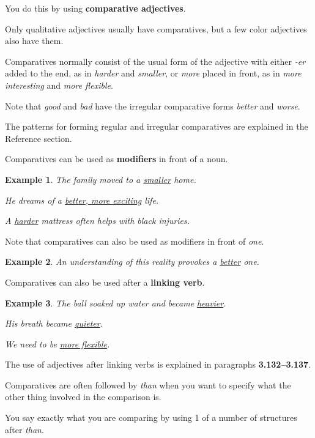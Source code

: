 \documentclass[oneside]{book}
\numberwithin{equation}{section}
\newtheorem{example}{Example}[section]
\begin{document}
You do this by using \textbf{comparative adjectives}.

Only qualitative adjectives usually have comparatives, but a few color adjectives also have them.

Comparatives normally consist of the usual form of the adjective with either \textit{-er} added to the end, as in \textit{harder} and \textit{smaller}, or \textit{more} placed in front, as in \textit{more interesting} and \textit{more flexible}.

%
Note that \textit{good} and \textit{bad} have the irregular comparative forms \textit{better} and \textit{worse}.

%
The patterns for forming regular and irregular comparatives are explained in the Reference section.

%
\noindent{} Comparatives can be used as \textbf{modifiers} in front of a noun.
\begin{example}
    The family moved to a \underline{smaller} home.
    
    He dreams of a \underline{better, more exciting} life.
    
    A \underline{harder} mattress often helps with black injuries.
\end{example}
Note that comparatives can also be used as modifiers in front of \textit{one}.
\begin{example}
    An understanding of this reality provokes a \underline{better} one.
\end{example}
%
\noindent{} Comparatives can also be used after a \textbf{linking verb}.
\begin{example}
    The ball soaked up water and became \underline{heavier}.
    
    His breath became \underline{quieter}.
    
    We need to be \underline{more flexible}.
\end{example}
The use of adjectives after linking verbs is explained in paragraphs \textbf{3.132--3.137}.

%
\noindent{} Comparatives are often followed by \textit{than} when you want to specify what the other thing involved in the comparison is.

You say exactly what you are comparing by using 1 of a number of structures after \textit{than}.
\end{document}
